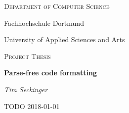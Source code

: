 {\centering
  {\small\scshape Department of Computer Science \par}
  {\large Fachhochschule Dortmund \par}
  {\large University of Applied Sciences and Arts \par}
  \vspace{1cm}
  {\large\scshape Project Thesis \par}
  \vspace{3cm}

  {\huge\bfseries Parse-free code formatting \par}
  \vspace{2cm}
  {\large\itshape Tim Seckinger \par}
  \vfill

  {\large TODO 2018-01-01}
}
